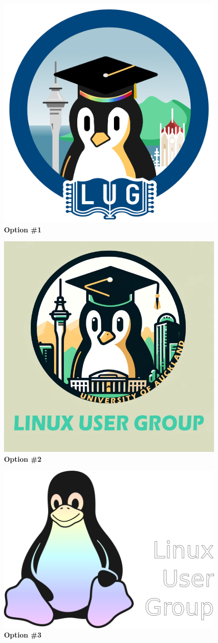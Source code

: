 \documentclass[11pt,fleqn]{article}
\begin{document}
\newpage


\begin{figure}
  \centering
  \includegraphics[width=0.56\linewidth]{res/1.png}
  \caption*{\Large{\textbf{Option \#1}}}
\end{figure}

\begin{figure}
  \centering
  \includegraphics[width=0.56\linewidth]{res/2.png}
  \caption*{\Large{\textbf{Option \#2}}}
\end{figure}

\begin{figure}
  \centering
  \includegraphics[width=0.56\linewidth]{res/3-initial-lug-logo.png}
  \caption*{\Large{\textbf{Option \#3}}}
\end{figure}
\end{document}
